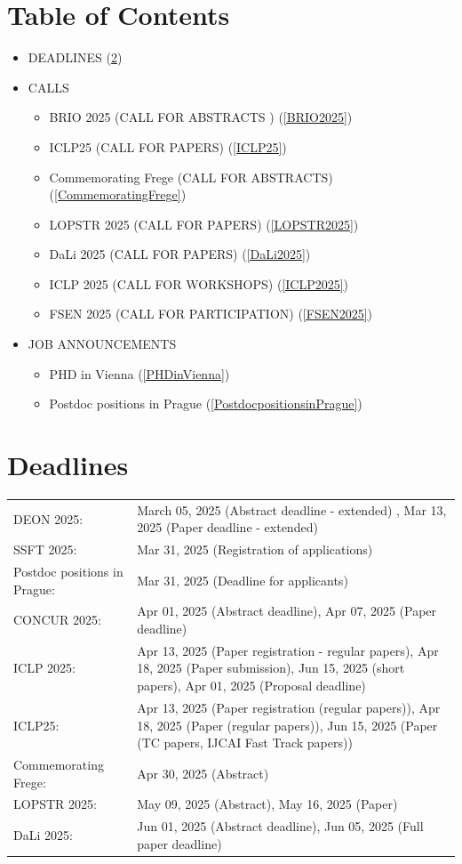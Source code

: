 \documentclass[prodmode,acmtecs]{acmsmall} %
\begin{document}
\section{Table of Contents}\begin{itemize}\item DEADLINES (\cref{deadlines}) 
 
\item CALLS 
 
\begin{itemize}\item BRIO 2025 (CALL FOR ABSTRACTS ) (\cref{BRIO2025})
\item ICLP25 (CALL FOR PAPERS) (\cref{ICLP25})
\item Commemorating Frege (CALL FOR ABSTRACTS) (\cref{CommemoratingFrege})
\item LOPSTR 2025 (CALL FOR PAPERS) (\cref{LOPSTR2025})
\item DaLi 2025 (CALL FOR PAPERS) (\cref{DaLi2025})
\item ICLP 2025 (CALL FOR WORKSHOPS) (\cref{ICLP2025})
\item FSEN 2025 (CALL FOR PARTICIPATION) (\cref{FSEN2025})
\end{itemize} 
\item JOB ANNOUNCEMENTS 
 
\begin{itemize}\item PHD in Vienna (\cref{PHDinVienna})
\item Postdoc positions in Prague (\cref{PostdocpositionsinPrague})
\end{itemize} 
\end{itemize}\section{Deadlines}\label{deadlines}\begin{tabulary}{\linewidth}{LL}DEON 2025:  & March 05, 2025 (Abstract deadline - extended) , Mar 13, 2025 (Paper deadline - extended) \\
SSFT 2025:  & Mar 31, 2025 (Registration of applications) \\
Postdoc positions in Prague:  & Mar 31, 2025 (Deadline for applicants) \\
CONCUR 2025:  & Apr 01, 2025 (Abstract deadline), Apr 07, 2025 (Paper deadline) \\
ICLP 2025:  & Apr 13, 2025 (Paper registration - regular papers), Apr 18, 2025 (Paper submission), Jun 15, 2025 (short papers), Apr 01, 2025 (Proposal  deadline) \\
ICLP25:  & Apr 13, 2025 (Paper registration (regular papers)), Apr 18, 2025 (Paper  (regular papers)), Jun 15, 2025 (Paper  (TC papers, IJCAI Fast Track papers)) \\
Commemorating Frege:  & Apr 30, 2025 (Abstract) \\
LOPSTR 2025:  & May 09, 2025 (Abstract), May 16, 2025 (Paper) \\
DaLi 2025:  & Jun 01, 2025 (Abstract  deadline), Jun 05, 2025 (Full paper  deadline) \\
\end{tabulary}
\end{document}
